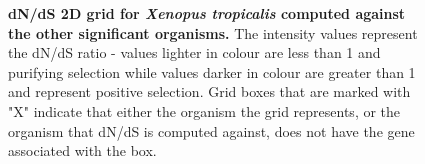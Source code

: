 \documentclass{article}
\begin{document}
\begin{figure}[H]
\centering
{}
\caption{\textbf{dN/dS 2D grid for \textit{Xenopus tropicalis} computed against the other significant organisms.} The intensity values represent the dN/dS ratio - values lighter in colour are less than 1 and purifying selection while values darker in colour are greater than 1 and represent positive selection. Grid boxes that are marked with "X" indicate that either the organism the grid represents, or the organism that dN/dS is computed against, does not have the gene associated with the box.}
\label{sup_fig_34}
\end{figure}
\end{document}
